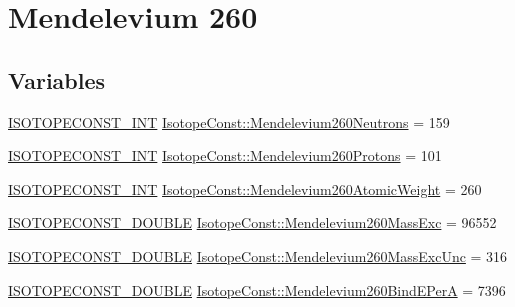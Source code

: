 \hypertarget{group___isotope_const-_mendelevium-_md260}{}\section{Mendelevium 260}
\label{group___isotope_const-_mendelevium-_md260}
\subsection*{Variables}
\begin{DoxyCompactItemize}
\item 
\mbox{\hyperlink{group___isotope_const-_macros_ga5f18360b3e99483a35c32d789e62621c}{I\+S\+O\+T\+O\+P\+E\+C\+O\+N\+S\+T\+\_\+\+I\+NT}} \mbox{\hyperlink{group___isotope_const-_mendelevium-_md260_gaeb854bd573fb82921b9ba4832f11d643}{Isotope\+Const\+::\+Mendelevium260\+Neutrons}} = 159
\item 
\mbox{\hyperlink{group___isotope_const-_macros_ga5f18360b3e99483a35c32d789e62621c}{I\+S\+O\+T\+O\+P\+E\+C\+O\+N\+S\+T\+\_\+\+I\+NT}} \mbox{\hyperlink{group___isotope_const-_mendelevium-_md260_gaa46d9faa8165b6e204ff8bc4ac52a68c}{Isotope\+Const\+::\+Mendelevium260\+Protons}} = 101
\item 
\mbox{\hyperlink{group___isotope_const-_macros_ga5f18360b3e99483a35c32d789e62621c}{I\+S\+O\+T\+O\+P\+E\+C\+O\+N\+S\+T\+\_\+\+I\+NT}} \mbox{\hyperlink{group___isotope_const-_mendelevium-_md260_ga2f1fe1daccf110d698fa46a424f41dcd}{Isotope\+Const\+::\+Mendelevium260\+Atomic\+Weight}} = 260
\item 
\mbox{\hyperlink{group___isotope_const-_macros_ga8f45a7272ce02c0b4c65c44636ed719a}{I\+S\+O\+T\+O\+P\+E\+C\+O\+N\+S\+T\+\_\+\+D\+O\+U\+B\+LE}} \mbox{\hyperlink{group___isotope_const-_mendelevium-_md260_gad6312118111da5c362c1c44b5e57ded6}{Isotope\+Const\+::\+Mendelevium260\+Mass\+Exc}} = 96552
\item 
\mbox{\hyperlink{group___isotope_const-_macros_ga8f45a7272ce02c0b4c65c44636ed719a}{I\+S\+O\+T\+O\+P\+E\+C\+O\+N\+S\+T\+\_\+\+D\+O\+U\+B\+LE}} \mbox{\hyperlink{group___isotope_const-_mendelevium-_md260_gaf2134bf4a36883cbd079f6b7f659680b}{Isotope\+Const\+::\+Mendelevium260\+Mass\+Exc\+Unc}} = 316
\item 
\mbox{\hyperlink{group___isotope_const-_macros_ga8f45a7272ce02c0b4c65c44636ed719a}{I\+S\+O\+T\+O\+P\+E\+C\+O\+N\+S\+T\+\_\+\+D\+O\+U\+B\+LE}} \mbox{\hyperlink{group___isotope_const-_mendelevium-_md260_gab8f03990057312a1858f3bb632602a7c}{Isotope\+Const\+::\+Mendelevium260\+Bind\+E\+PerA}} = 7396

\end{DoxyCompactItemize}
